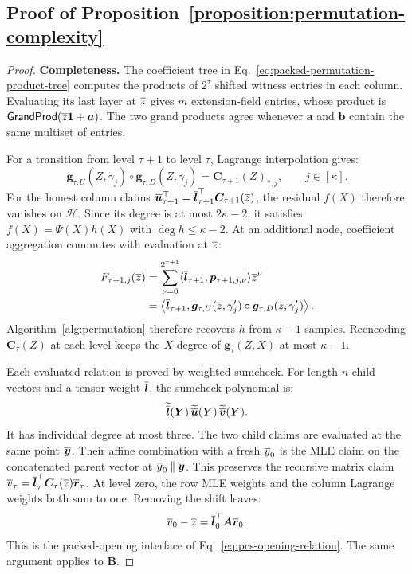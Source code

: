 \subsection{Proof of Proposition~\ref{proposition:permutation-complexity}}
\label{appx:proof-permutation}

\begin{proof}
\noindent\textbf{Completeness.}
The coefficient tree in
Eq.~\eqref{eq:packed-permutation-product-tree} computes the
products of \(2^\tau\) shifted witness entries in each column.
Evaluating its last layer at \(\overline{z}\) gives \(m\)
extension-field entries, whose product is
\(\mathsf{GrandProd}(\overline{z}\bm1+\bm a)\).
The two grand products agree whenever \(\bm a\) and \(\bm b\)
contain the same multiset of entries.

For a transition from level \(\tau+1\) to level \(\tau\),
Lagrange interpolation gives:
\[
    \bm g_{\tau,U}(Z,\gamma_j)
      \circ\bm g_{\tau,D}(Z,\gamma_j)
       =\bm C_{\tau+1}(Z)_{*,j},
    \qquad j\in[\kappa].
\]
For the honest column claims
\(\overline{\bm u}_{\tau+1}^\top
=\overline{\bm l}_{\tau+1}^\top\bm C_{\tau+1}(\overline{z})\),
the residual \(f(X)\) therefore vanishes on \(\mathcal H\).
Since its degree is at most \(2\kappa-2\), it satisfies
\(f(X)=\Psi(X)h(X)\) with \(\deg h\leq\kappa-2\).
At an additional node, coefficient aggregation commutes with
evaluation at \(\overline{z}\):
\[
\begin{aligned}
    F_{\tau+1,j}(\overline{z})
      &=\sum_{\nu=0}^{2^{\tau+1}}
        \langle\overline{\bm l}_{\tau+1},
                 \bm p_{\tau+1,j,\nu}\rangle\overline{z}^\nu\\
      &=\left\langle\overline{\bm l}_{\tau+1},
             \bm g_{\tau,U}(\overline{z},\gamma'_j)
               \circ\bm g_{\tau,D}(\overline{z},\gamma'_j)
        \right\rangle.
\end{aligned}
\]
Algorithm~\ref{alg:permutation} therefore recovers \(h\) from
\(\kappa-1\) samples. Reencoding \(\bm C_\tau(Z)\) at each
level keeps the \(X\)-degree of \(\bm g_\tau(Z,X)\) at most
\(\kappa-1\).

Each evaluated relation is proved by weighted sumcheck.
For length-\(n\) child vectors and a tensor weight
\(\overline{\bm l}\), the sumcheck polynomial is:
\begin{equation}
    \widetilde{\overline{\bm l}}(\bm Y)\,
    \widetilde{\overline{\bm u}}(\bm Y)\,
    \widetilde{\overline{\bm v}}(\bm Y).
\label{eq:permutation-hadamard-as-ip}
\end{equation}
It has individual degree at most three.
The two child claims are evaluated at the same point
\(\overline{\bm y}\). Their affine combination with a fresh
\(\overline{y}_0\) is the MLE claim on the concatenated parent
vector at \(\overline{y}_0\mathbin\|\overline{\bm y}\).
This preserves the recursive matrix claim
\(\overline{v}_\tau=\overline{\bm l}_\tau^\top
\bm C_\tau(\overline{z})\overline{\bm r}_\tau\).
At level zero, the row MLE weights and the column Lagrange
weights both sum to one. Removing the shift leaves:
\[
    \overline{v}_0-\overline{z}
       =\overline{\bm l}_0^\top\bm A\overline{\bm r}_0.
\]
This is the packed-opening interface of
Eq.~\eqref{eq:pcs-opening-relation}. The same argument applies
to \(\bm B\).


\end{proof}
